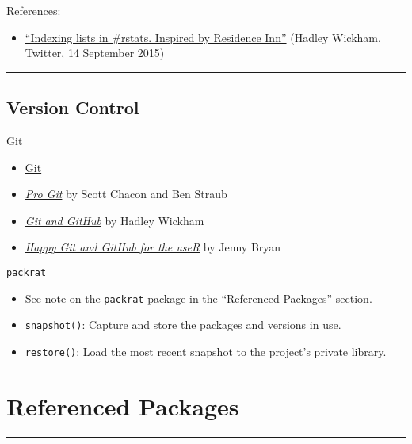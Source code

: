 \documentclass[]{book}
\providecommand{\tightlist}{%
  \setlength{\itemsep}{0pt}\setlength{\parskip}{0pt}}
\theoremstyle{definition}
\theoremstyle{definition}
\theoremstyle{definition}
\theoremstyle{remark}
\begin{document}
References:

\begin{itemize}
\tightlist
\item
  \href{https://twitter.com/hadleywickham/status/643381054758363136}{``Indexing
  lists in \#rstats. Inspired by Residence Inn''} (Hadley Wickham,
  Twitter, 14 September 2015)
\end{itemize}

\begin{center}\rule{0.5\linewidth}{\linethickness}\end{center}

\section{Version Control}\label{version-control}

Git

\begin{itemize}
\tightlist
\item
  \href{https://git-scm.com/}{Git}
\item
  \href{https://git-scm.com/book/en/v2}{\emph{Pro Git}} by Scott Chacon
  and Ben Straub
\item
  \href{http://r-pkgs.had.co.nz/git.html\#git-learning}{\emph{Git and
  GitHub}} by Hadley Wickham
\item
  \href{http://happygitwithr.com/}{\emph{Happy Git and GitHub for the
  useR}} by Jenny Bryan
\end{itemize}

\texttt{packrat}

\begin{itemize}
\tightlist
\item
  See note on the \texttt{packrat} package in the ``Referenced
  Packages'' section.
\item
  \texttt{snapshot()}: Capture and store the packages and versions in
  use.
\item
  \texttt{restore()}: Load the most recent snapshot to the project's
  private library.
\end{itemize}

\chapter{Referenced Packages}\label{referenced-packages}

\begin{center}\rule{0.5\linewidth}{\linethickness}\end{center}
\end{document}
